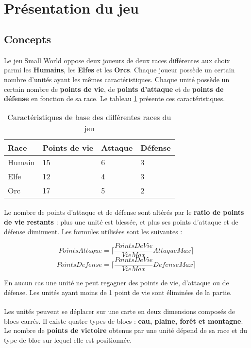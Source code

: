 \section{Présentation du jeu}

\subsection{Concepts}

\paragraph{}
Le jeu Small World oppose deux joueurs de deux races différentes aux choix parmi les \textbf{Humains}, les \textbf{Elfes} et les \textbf{Orcs}.
Chaque joueur possède un certain nombre d'unités ayant les mêmes caractéristiques. Chaque unité possède un certain nombre de \textbf{points de vie}, de \textbf{points d'attaque} et de \textbf{points de défense} en fonction de sa race.
Le tableau \ref{fig:caracteristiques} présente ces caractéristiques.

\begin{table}[h!]
  \centering
  \begin{tabular}{|l|l|l|l|}
    \hline
    Race&Points de vie&Attaque&Défense\\
    \hline
    Humain&15&6&3\\
    \hline
    Elfe&12&4&3\\
    \hline
    Orc&17&5&2\\
    \hline
  \end{tabular}
  \caption{Caractéristiques de base des différentes races du jeu}
  \label{fig:caracteristiques}
\end{table}

\paragraph{}
Le nombre de points d'attaque et de défense sont altérés par le \textbf{ratio de points de vie restants} : plus une unité est blessée, et plus ses points d'attaque et de défense diminuent. Les formules utilisées sont les suivantes :

\begin{displaymath}
  PointsAttaque = \lceil \frac{PointsDeVie}{VieMax} AttaqueMax \rceil
\end{displaymath}
\begin{displaymath}
  PointsDefense = \lceil \frac{PointsDeVie}{VieMax} DefenseMax \rceil
\end{displaymath}

En aucun cas une unité ne peut regagner des points de vie, d'attaque ou de défense. Les unités ayant moins de 1 point de vie sont éliminées de la partie.

\paragraph{}
Les unités peuvent se déplacer sur une carte en deux dimensions composés de blocs carrés.
Il existe quatre types de blocs : \textbf{eau, plaine, forêt et montagne}. Le nombre de \textbf{points de victoire} obtenus par une unité dépend de sa race et du type de bloc sur lequel elle est positionnée. %
